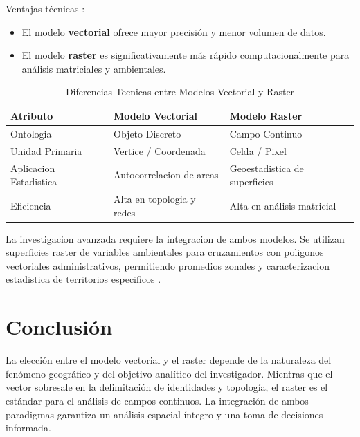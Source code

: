 \documentclass[11pt,a4paper]{article}
\begin{document}
Ventajas técnicas \cite{yao2018big, bajjali2017working}:
\begin{itemize}
    \item El modelo \textbf{vectorial} ofrece mayor precisión y menor volumen de datos.
    \item El modelo \textbf{raster} es significativamente más rápido computacionalmente para análisis matriciales y ambientales.
\end{itemize}

\begin{table}[H]
\centering
\caption{Diferencias Tecnicas entre Modelos Vectorial y Raster}
\begin{tabular}{@{}lll@{}}
\toprule
\textbf{Atributo} & \textbf{Modelo Vectorial} & \textbf{Modelo Raster} \\ \midrule
Ontologia & Objeto Discreto & Campo Continuo \\
Unidad Primaria & Vertice / Coordenada & Celda / Pixel \\
Aplicacion Estadistica & Autocorrelacion de areas & Geoestadistica de superficies \\
Eficiencia & Alta en topologia y redes & Alta en análisis matricial \\ \bottomrule
\end{tabular}
\end{table}

La investigacion avanzada requiere la integracion de ambos modelos. Se utilizan superficies raster de variables ambientales para cruzamientos con poligonos vectoriales administrativos, permitiendo promedios zonales y caracterizacion estadistica de territorios especificos \cite{giofandi2023comparison}.

\section{Conclusión}
La elección entre el modelo vectorial y el raster depende de la naturaleza del fenómeno geográfico y del objetivo analítico del investigador. Mientras que el vector sobresale en la delimitación de identidades y topología, el raster es el estándar para el análisis de campos continuos. La integración de ambos paradigmas garantiza un análisis espacial íntegro y una toma de decisiones informada.



\end{document}
